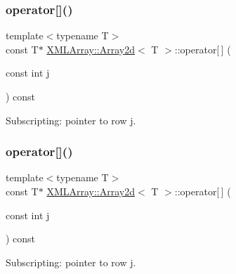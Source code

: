 \subsubsection{\texorpdfstring{operator[]()}{operator[]()}\hspace{0.1cm}{\footnotesize\ttfamily [5/6]}}
{\footnotesize\ttfamily template$<$typename T$>$ \\
const T$\ast$ \mbox{\hyperlink{classXMLArray_1_1Array2d}{X\+M\+L\+Array\+::\+Array2d}}$<$ T $>$\+::operator\mbox{[}$\,$\mbox{]} (\begin{DoxyParamCaption}\item[{const int}]{j }\end{DoxyParamCaption}) const\hspace{0.3cm}{\ttfamily [inline]}}



Subscripting\+: pointer to row j. 

\mbox{\label{classXMLArray_1_1Array2d_a956a4739a0e6529302542b0fdf3c1da8}} 
\subsubsection{\texorpdfstring{operator[]()}{operator[]()}\hspace{0.1cm}{\footnotesize\ttfamily [6/6]}}
{\footnotesize\ttfamily template$<$typename T$>$ \\
const T$\ast$ \mbox{\hyperlink{classXMLArray_1_1Array2d}{X\+M\+L\+Array\+::\+Array2d}}$<$ T $>$\+::operator\mbox{[}$\,$\mbox{]} (\begin{DoxyParamCaption}\item[{const int}]{j }\end{DoxyParamCaption}) const\hspace{0.3cm}{\ttfamily [inline]}}



Subscripting\+: pointer to row j. 

\mbox{\label{classXMLArray_1_1Array2d_a64001cb2aac062d2179a0285b0279244}} 
